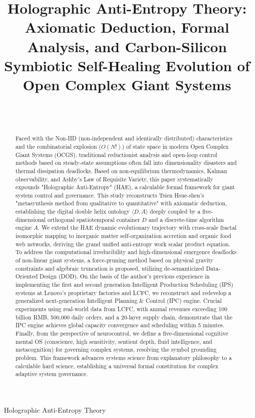 \documentclass{article}
\begin{document}
\title{Holographic Anti-Entropy Theory: Axiomatic Deduction, Formal Analysis, and Carbon-Silicon Symbiotic Self-Healing Evolution of Open Complex Giant Systems}

\author{\\[2pt]
\\
}

{Holographic Anti-Entropy Theory}

\maketitle

\begin{abstract}
Faced with the Non-IID (non-independent and identically distributed) characteristics and the combinatorial explosion ($O(N!)$) of state space in modern Open Complex Giant Systems (OCGS), traditional reductionist analysis and open-loop control methods based on steady-state assumptions often fall into dimensionality disasters and thermal dissipation deadlocks. Based on non-equilibrium thermodynamics, Kalman observability, and Ashby's Law of Requisite Variety, this paper systematically expounds "Holographic Anti-Entropy" (HAE), a calculable formal framework for giant system control and governance. This study reconstructs Tsien Hsue-shen's "metasynthesis method from qualitative to quantitative" with axiomatic deduction, establishing the digital double helix ontology $\langle D, A \rangle$ deeply coupled by a five-dimensional orthogonal spatiotemporal container $D$ and a discrete-time algorithm engine $A$. We extend the HAE dynamic evolutionary trajectory with cross-scale fractal isomorphic mapping to inorganic matter self-organization accretion and organic food web networks, deriving the grand unified anti-entropy work scalar product equation. To address the computational irreducibility and high-dimensional emergence deadlocks of non-linear giant systems, a force-pruning method based on physical gravity constraints and algebraic truncation is proposed, utilizing de-semanticized Data-Oriented Design (DOD). On the basis of the author's previous experience in implementing the first and second generation Intelligent Production Scheduling (IPS) systems at Lenovo's proprietary factories and LCFC, we reconstruct and redevelop a generalized next-generation Intelligent Planning \& Control (IPC) engine. Crucial experiments using real-world data from LCFC, with annual revenues exceeding 100 billion RMB, 500,000 daily orders, and a 20-layer supply chain, demonstrate that the IPC engine achieves global capacity convergence and scheduling within 5 minutes. Finally, from the perspective of neurocontrol, we define a five-dimensional cognitive mental OS (conscience, high sensitivity, sentient depth, fluid intelligence, and metacognition) for governing complex systems, resolving the symbol grounding problem. This framework advances systems science from explanatory philosophy to a calculable hard science, establishing a universal formal constitution for complex adaptive system governance.
\end{abstract}
\end{document}
